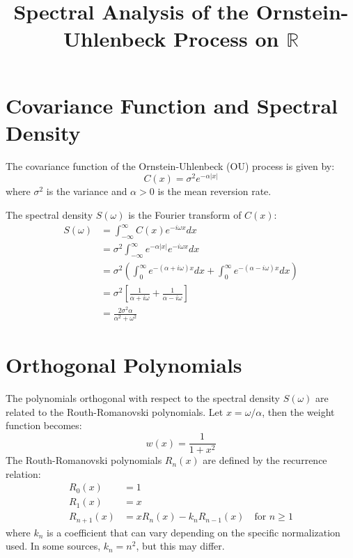 \documentclass{article}
\begin{document}
\title{Spectral Analysis of the Ornstein-Uhlenbeck Process on $\mathbb{R}$}

\date{}

\maketitle

\section{Covariance Function and Spectral Density}

The covariance function of the Ornstein-Uhlenbeck (OU) process is given by:
\begin{equation}
  C (x) = \sigma^2 e^{- \alpha |x|}
\end{equation}
where $\sigma^2$ is the variance and $\alpha > 0$ is the mean reversion rate.

The spectral density $S (\omega)$ is the Fourier transform of $C (x)$:
\begin{equation}
  \begin{array}{ll}
    S (\omega) & = \int_{- \infty}^{\infty} C (x) e^{- i \omega x} dx\\
    & = \sigma^2  \int_{- \infty}^{\infty} e^{- \alpha |x|} e^{- i \omega x}
    dx\\
    & = \sigma^2  \left( \int_0^{\infty} e^{- (\alpha + i \omega) x} dx +
    \int_0^{\infty} e^{- (\alpha - i \omega) x} dx \right)\\
    & = \sigma^2  \left[ \frac{1}{\alpha + i \omega} + \frac{1}{\alpha - i
    \omega} \right]\\
    & = \frac{2 \sigma^2 \alpha}{\alpha^2 + \omega^2}
  \end{array}
\end{equation}

\section{Orthogonal Polynomials}

The polynomials orthogonal with respect to the spectral density $S (\omega)$
are related to the Routh-Romanovski polynomials. Let $x = \omega / \alpha$,
then the weight function becomes:
\begin{equation}
  w (x) = \frac{1}{1 + x^2}
\end{equation}
The Routh-Romanovski polynomials $R_n (x)$ are defined by the recurrence
relation:
\begin{equation}
  \begin{array}{ll}
    R_0 (x) & = 1\\
    R_1 (x) & = x\\
    R_{n + 1} (x) & = xR_n (x) - k_n R_{n - 1} (x)  \quad \text{for } n \geq 1
  \end{array}
\end{equation}
where $k_n$ is a coefficient that can vary depending on the specific
normalization used. In some sources, $k_n = n^2$, but this may differ.
\end{document}
